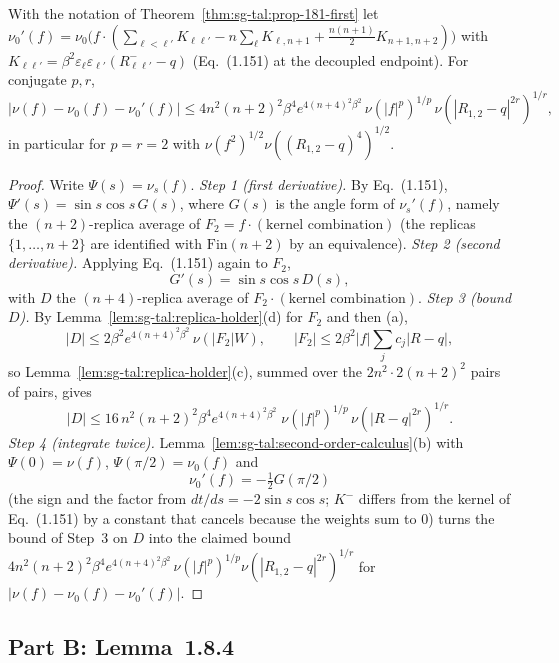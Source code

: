 \begin{theorem}
\label{thm:sg-tal:prop-181-second}
  \leanok
{}
With the notation of Theorem~\ref{thm:sg-tal:prop-181-first} let $\nu_0'(f)=\nu_0\bigl(f\cdot(\sum_{\ell<\ell'}K_{\ell\ell'}-n\sum_\ell K_{\ell,n+1}+\frac{n(n+1)}2K_{n+1,n+2})\bigr)$ with $K_{\ell\ell'}=\beta^2\varepsilon_\ell\varepsilon_{\ell'}(R^-_{\ell\ell'}-q)$ (Eq.~(1.151) at the decoupled endpoint).  For conjugate $p,r$,
\[
|\nu(f)-\nu_0(f)-\nu_0'(f)|\le4n^2(n+2)^2\beta^4e^{4(n+4)^2\beta^2}\,\nu(|f|^p)^{1/p}\,\nu(|R_{1,2}-q|^{2r})^{1/r},
\]
in particular for $p=r=2$ with $\nu(f^2)^{1/2}\nu((R_{1,2}-q)^4)^{1/2}$.
\end{theorem}
\begin{proof}
  \leanok
Write $\Psi(s)=\nu_s(f)$.
\emph{Step 1 (first derivative).} By Eq.~(1.151), $\Psi'(s)=\sin s\cos s\,G(s)$, where $G(s)$ is the angle form of $\nu_s'(f)$, namely the $(n+2)$-replica average of $F_2=f\cdot(\text{kernel combination})$ (the replicas $\{1,\dots,n+2\}$ are identified with $\mathrm{Fin}(n+2)$ by an equivalence).
\emph{Step 2 (second derivative).} Applying Eq.~(1.151) again to $F_2$,
\[
G'(s)=\sin s\cos s\,D(s),
\]
with $D$ the $(n+4)$-replica average of $F_2\cdot(\text{kernel combination})$.
\emph{Step 3 (bound $D$).} By Lemma~\ref{lem:sg-tal:replica-holder}(d) for $F_2$ and then (a),
\[
|D|\le2\beta^2e^{4(n+4)^2\beta^2}\,\nu(|F_2|W),\qquad|F_2|\le2\beta^2|f|\sum_jc_j|R-q| ,
\]
so Lemma~\ref{lem:sg-tal:replica-holder}(c), summed over the $2n^2\cdot2(n+2)^2$ pairs of pairs, gives
\[
|D|\le16\,n^2(n+2)^2\beta^4e^{4(n+4)^2\beta^2}\;\nu(|f|^p)^{1/p}\,\nu(|R-q|^{2r})^{1/r}.
\]
\emph{Step 4 (integrate twice).} Lemma~\ref{lem:sg-tal:second-order-calculus}(b) with $\Psi(0)=\nu(f)$, $\Psi(\pi/2)=\nu_0(f)$ and
\[
\nu_0'(f)=-\tfrac12G(\pi/2)
\]
(the sign and the factor from $dt/ds=-2\sin s\cos s$; $K^-$ differs from the kernel of Eq.~(1.151) by a constant that cancels because the weights sum to $0$) turns the bound of Step~3 on $D$ into the claimed bound $4n^2(n+2)^2\beta^4e^{4(n+4)^2\beta^2}\,\nu(|f|^p)^{1/p}\nu(|R_{1,2}-q|^{2r})^{1/r}$ for $|\nu(f)-\nu_0(f)-\nu_0'(f)|$.
\end{proof}

\subsection{Part B: Lemma~1.8.4}

